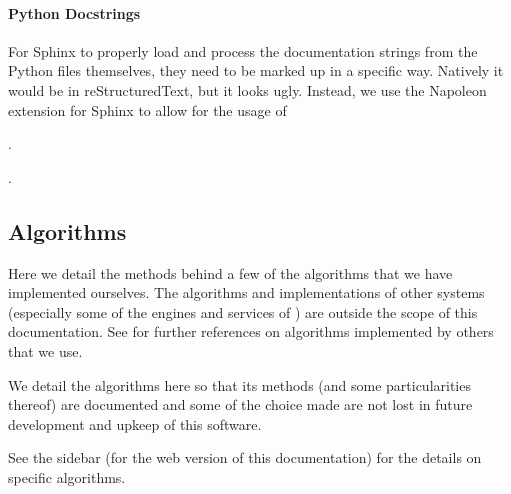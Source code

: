 \documentclass[letterpaper,11pt,english]{sphinxmanual}
\begin{document}
\paragraph{Python Docstrings}
\label{\detokenize{technical/conventions:python-docstrings}}
\sphinxAtStartPar
For Sphinx to properly load and process the documentation strings from the
Python files themselves, they need to be marked up in a specific way. Natively
it would be in reStructuredText, but it looks ugly. Instead, we use the
Napoleon extension for Sphinx to allow for the usage of
%
\begin{footnote}[66]\sphinxAtStartFootnote
{}
%
\end{footnote}.
%
\begin{footnote}[67]\sphinxAtStartFootnote
{}
%
\end{footnote}.

\sphinxstepscope


\subsection{Algorithms}
\label{\detokenize{technical/algorithms/index:algorithms}}\label{\detokenize{technical/algorithms/index::doc}}
\sphinxAtStartPar
Here we detail the methods behind a few of the algorithms that we have
implemented ourselves. The algorithms and implementations of other systems
(especially some of the engines and services of
{\hyperref[\detokenize{technical/architecture/services_engines:technical-architecture-services-engines}]{}}) are outside the scope of this
documentation. See {\hyperref[\detokenize{user/citations:user-citations}]{}} for further references on algorithms
implemented by others that we use.

\sphinxAtStartPar
We detail the algorithms here so that its methods (and some particularities
thereof) are documented and some of the choice made are not lost in future
development and upkeep of this software.

\sphinxAtStartPar
See the sidebar (for the web version of this documentation) for the details on
specific algorithms.
\end{document}
